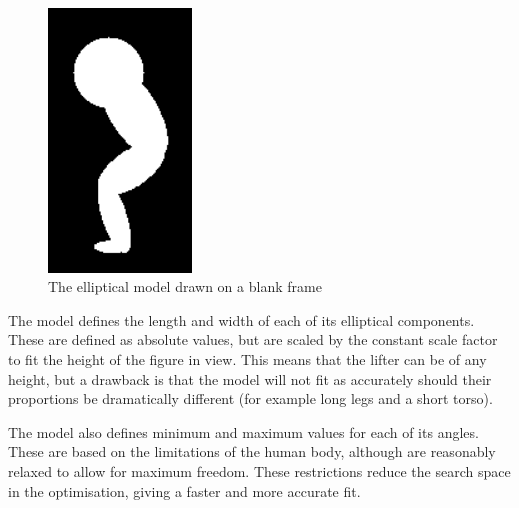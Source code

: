 \begin{figure}[H]
    \centering
	\includegraphics[height=7cm]{algorithm/images/model_drawn}
\caption{The elliptical model drawn on a blank frame}
\label{fig:modeldrawn}
\end{figure}

The model defines the length and width of each of its elliptical components. These are defined as absolute values, but are scaled by the constant scale factor to fit the height of the figure in view. This means that the lifter can be of any height, but a drawback is that the model will not fit as accurately should their proportions be dramatically different (for example long legs and a short torso).

The model also defines minimum and maximum values for each of its angles. These are based on the limitations of the human body, although are reasonably relaxed to allow for maximum freedom. These restrictions reduce the search space in the optimisation, giving a faster and more accurate fit.
